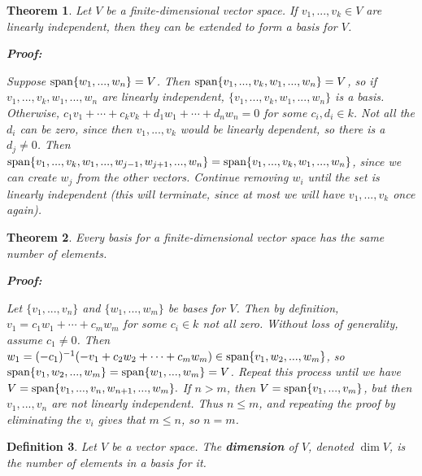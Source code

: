 \documentclass{article}
\theoremstyle{colontheorem}
\newtheorem{theorem}{Theorem}[section]
\newtheorem{definition}[theorem]{Definition}
\newcommand{\Span}{\textnormal{span}}
\newenvironment{Theorem}
{
	\begin{mdframed}[backgroundcolor=TheoremOrange!10]
	\begin{theorem}
}
{
	\end{theorem}
	\end{mdframed}
	
	\vspace{.15in}
}
\newenvironment{Def}
{
	\begin{mdframed}[backgroundcolor=DefGreen!10]
	\begin{definition}
}
{
	\end{definition}
	\end{mdframed}
	
	\vspace{.15in}
}
\newenvironment{Proof}
{
	\begin{mdframed}[backgroundcolor=ProofPurple!10]
	\textbf{Proof:}%
}
{
	\end{mdframed}
	
	\vspace{.085in}
}
\begin{document}
\begin{Theorem}
	
	Let $V$ be a finite-dimensional vector space. If $v_1, ..., v_k \in V$ are linearly independent, then they can be extended to form a basis for $V$.
	
	\begin{Proof}
		Suppose $\Span \{w_1, ..., w_n\} = V$. Then $\Span \{v_1, ..., v_k, w_1, ..., w_n\} = V$, so if $v_1, ..., v_k, w_1, ..., w_n$ are linearly independent, $\{v_1, ..., v_k, w_1, ..., w_n\}$ is a basis. Otherwise, $c_1 v_1 + \cdots + c_k v_k + d_1 w_1 + \cdots + d_n w_n = 0$ for some $c_i , d_i \in k$. Not all the $d_i$ can be zero, since then $v_1, ..., v_k$ would be linearly dependent, so there is a $d_j \neq 0$. Then $\Span \{v_1, ..., v_k, w_1, ..., w_{j-1}, w_{j+1}, ..., w_n\} = \Span \{v_1, ..., v_k, w_1, ..., w_n\}$, since we can create $w_j$ from the other vectors. Continue removing $w_i$ until the set is linearly independent (this will terminate, since at most we will have $v_1, ..., v_k$ once again).
		
	\end{Proof}
	
\end{Theorem}



\begin{Theorem}
	
	Every basis for a finite-dimensional vector space has the same number of elements.
	
	\begin{Proof}
		Let $\{v_1, ..., v_n\}$ and $\{w_1, ..., w_m\}$ be bases for $V$. Then by definition, $v_1 = c_1 w_1 + \cdots + c_m w_m$ for some $c_i \in k$ not all zero. Without loss of generality, assume $c_1 \neq 0$. Then $w_1 = (-c_1)^{-1}(-v_1 + c_2 w_2 + \cdots + c_m w_m) \in \Span \{v_1, w_2, ..., w_m\}$, so $\Span \{v_1, w_2, ..., w_m\} = \Span \{w_1, ..., w_m\} = V$. Repeat this process until we have $V = \Span \{v_1, ..., v_n, w_{n+1}, ..., w_m\}.$ If $n > m$, then $V = \Span \{v_1, ..., v_m\}$, but then $v_1, ..., v_n$ are not linearly independent. Thus $n \leq m$, and repeating the proof by eliminating the $v_i$ gives that $m \leq n$, so $n = m$.
		
	\end{Proof}
	\vspace{-.02in}
\end{Theorem}



\begin{Def}
	
	Let $V$ be a vector space. The \textbf{dimension} of $V$, denoted $\dim V$, is the number of elements in a basis for it.
	
\end{Def}
\end{document}
